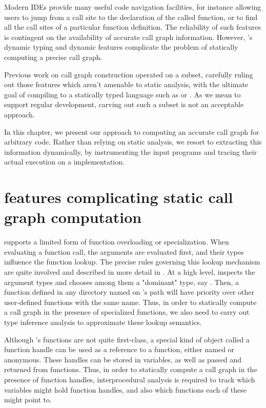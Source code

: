 Modern IDEs provide many useful code navigation facilities, for instance
allowing users to jump from a call site to the declaration of the called
function, or to find all the call sites of a particular function definition.
The reliability of such features is contingent on the availability of accurate
call graph information. However, \matlab's dynamic typing and dynamic features
complicate the problem of statically computing a precise call graph.

Previous work on \matlab call graph construction operated on a \matlab subset,
carefully ruling out those features which aren't amenable to static analysis,
with the ultimate goal of compiling \matlab to a statically typed language such
as \fortran or \xten \cite{Tamer}. As we mean to support regular \matlab
development, carving out such a subset is not an acceptable approach.

In this chapter, we present our approach to computing an accurate call graph
for arbitrary \matlab code. Rather than relying on static analysis, we resort
to extracting this information dynamically, by instrumenting the input programs
and tracing their actual execution on a \matlab implementation.

\section{\matlab features complicating static call graph computation}

\matlab supports a limited form of function overloading or specialization. When
evaluating a function call, the arguments are evaluated first, and their types
influence the function lookup. The precise rules governing this lookup
mechanism are quite involved and described in more detail in \cite{Tamer}. At a
high level, \matlab inspects the argument types and chooses among them a
"dominant" type, say . Then, a function defined in any directory
named  on \matlab's path will have priority over other
user-defined functions with the same name. Thus, in order to statically compute
a call graph in the presence of specialized functions, we also need to carry
out type inference analysis to approximate these lookup semantics.

Although \matlab's functions are not quite first-class, a special kind of
object called a function handle can be used as a reference to a function,
either named or anonymous. These handles can be stored in variables, as well as
passed and returned from functions. Thus, in order to statically compute a call
graph in the presence of function handles, interprocedural analysis is required
to track which variables might hold function handles, and also which functions
each of these might point to.

